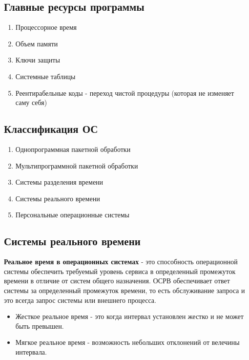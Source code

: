 \documentclass[a4paper, 14pt]{report}
\begin{document}
\subsection{Главные ресурсы программы}

\begin{enumerate}
    \item Процессорное время
    \item Объем памяти
    \item Ключи защиты
    \item Системные таблицы
    \item Реентирабельные коды - переход чистой процедуры (которая не изменяет саму себя)
\end{enumerate}

\subsection{Классификация ОС}

\begin{enumerate}
    \item Однопрограммная пакетной обработки
    \item Мультипрограммной пакетной обработки
    \item Системы разделения времени


    \item Системы реального времени
    \item Персональные операционные системы
\end{enumerate}

\subsection{Системы реального времени}

\textbf{Реальное время в операционных системах} - это способность операционной системы обеспечить требуемый уровень сервиса в определенный промежуток времени в отличие от систем общего назначения. ОСРВ обеспечивает ответ системы за определенный промежуток времени, то есть обслуживание запроса и это всегда запрос системы или внешнего процесса.

\begin{itemize}
    \item Жесткое реальное время - это когда интервал установлен жестко и не может быть превышен.

    \item Мягкое реальное время - возможность небольших отклонений от велечины интервала.
\end{itemize}
\end{document}
